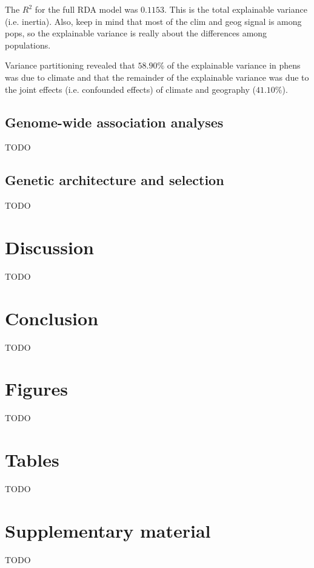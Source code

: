 \documentclass[fleqn,11pt]{wlpeerj}
\begin{document}
The $R^{2}$ for the full RDA model was $0.1153$. This is the total explainable variance (i.e. inertia).
Also, keep in mind that most of the clim and geog signal is among pops, so the
explainable variance is really about the differences among populations.

Variance partitioning revealed that $58.90\%$ of the explainable variance in phens
was due to climate and that the remainder of the explainable variance was due to
the joint effects (i.e. confounded effects) of climate and geography ($41.10\%$).

\subsection*{Genome-wide association analyses}
TODO

\subsection*{Genetic architecture and selection}
TODO

\section*{Discussion}
TODO


\section*{Conclusion}
TODO


\section*{Figures}
TODO

\section*{Tables}
TODO

\section*{Supplementary material}
TODO

\clearpage

\end{document}
